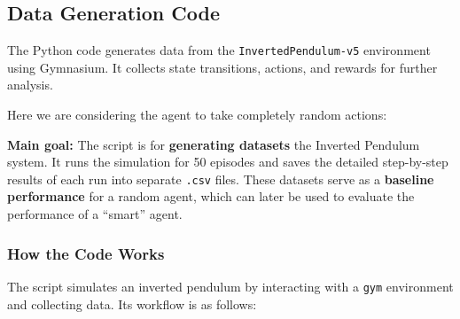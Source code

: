 \documentclass[12pt]{article}
\begin{document}

\subsection{Data Generation Code}

The Python code generates data from the \texttt{InvertedPendulum-v5} environment using Gymnasium.  
It collects state transitions, actions, and rewards for further analysis.

\noindent
Here we are considering the agent to take completely random actions:

\vspace{2mm}

\textbf{Main goal:} The script is for \textbf{generating datasets} the Inverted Pendulum system. It runs the simulation for 50 episodes and saves the detailed step-by-step results of each run into separate \texttt{.csv} files. These datasets serve as a \textbf{baseline performance} for a random agent, which can later be used to evaluate the performance of a ``smart'' agent.



\subsubsection{How the Code Works}

The script simulates an inverted pendulum by interacting with a \texttt{gym} environment and collecting data. Its workflow is as follows:
\end{document}
